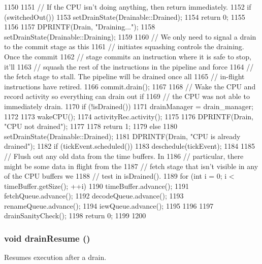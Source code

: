 \begin{DoxyCode}
1150 {
1151     // If the CPU isn't doing anything, then return immediately.
1152     if (switchedOut()) {
1153         setDrainState(Drainable::Drained);
1154         return 0;
1155     }
1156 
1157     DPRINTF(Drain, "Draining...\n");
1158     setDrainState(Drainable::Draining);
1159 
1160     // We only need to signal a drain to the commit stage as this
1161     // initiates squashing controls the draining. Once the commit
1162     // stage commits an instruction where it is safe to stop, it'll
1163     // squash the rest of the instructions in the pipeline and force
1164     // the fetch stage to stall. The pipeline will be drained once all
1165     // in-flight instructions have retired.
1166     commit.drain();
1167 
1168     // Wake the CPU and record activity so everything can drain out if
1169     // the CPU was not able to immediately drain.
1170     if (!isDrained())  {
1171         drainManager = drain_manager;
1172 
1173         wakeCPU();
1174         activityRec.activity();
1175 
1176         DPRINTF(Drain, "CPU not drained\n");
1177 
1178         return 1;
1179     } else {
1180         setDrainState(Drainable::Drained);
1181         DPRINTF(Drain, "CPU is already drained\n");
1182         if (tickEvent.scheduled())
1183             deschedule(tickEvent);
1184 
1185         // Flush out any old data from the time buffers.  In
1186         // particular, there might be some data in flight from the
1187         // fetch stage that isn't visible in any of the CPU buffers we
1188         // test in isDrained().
1189         for (int i = 0; i < timeBuffer.getSize(); ++i) {
1190             timeBuffer.advance();
1191             fetchQueue.advance();
1192             decodeQueue.advance();
1193             renameQueue.advance();
1194             iewQueue.advance();
1195         }
1196 
1197         drainSanityCheck();
1198         return 0;
1199     }
1200 }
\end{DoxyCode}
\hypertarget{classFullO3CPU_a8f020d3237536fe007fc488c4125c5d8}{
\subsubsection[{drainResume}]{\setlength{\rightskip}{0pt plus 5cm}void drainResume ()}}
\label{classFullO3CPU_a8f020d3237536fe007fc488c4125c5d8}
Resumes execution after a drain. 


